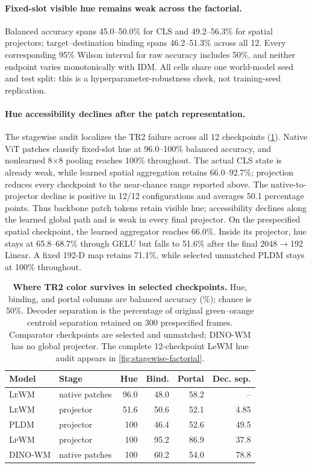 \documentclass{article}
\newcommand{\lewm}{\textsc{LeWM}}
\newcommand{\pldm}{\textsc{PLDM}}
\newcommand{\lpwm}{\textsc{LpWM}}
\newcommand{\dinowm}{\textsc{DINO-WM}}
\begin{document}
\paragraph{Fixed-slot visible hue remains weak across the factorial.}
Balanced accuracy spans 45.0--50.0\% for CLS and 49.2--56.3\% for spatial
projectors; target--destination binding spans 46.2--51.3\% across all 12.
Every corresponding 95\% Wilson interval for raw accuracy includes 50\%, and
neither endpoint varies monotonically with IDM.  All cells share one
world-model seed and test split: this is a hyperparameter-robustness check, not
training-seed replication.

\paragraph{Hue accessibility declines after the patch representation.}
The stagewise audit localizes the TR2 failure across all 12 checkpoints
(\cref{tab:tr2-stagewise}).  Native ViT patches classify fixed-slot hue at
96.0--100\% balanced accuracy, and nonlearned 8$\times$8 pooling reaches 100\%
throughout.  The actual CLS state is already weak, while learned spatial
aggregation retains 66.0--92.7\%; projection reduces every checkpoint to the
near-chance range reported above.  The native-to-projector decline is positive
in 12/12 configurations and averages 50.1 percentage points.  Thus backbone patch tokens
retain visible hue; accessibility declines along the learned global path and
is weak in every final projector.  On the prespecified spatial checkpoint, the
learned aggregator reaches 66.0\%.  Inside its projector, hue stays at
65.8--68.7\% through GELU but falls to 51.6\% after the final
2048$\rightarrow$192 Linear.  A fixed 192-D map retains 71.1\%, while selected
unmatched PLDM stays at 100\% throughout.

\begin{table}[h]
\centering
\footnotesize
\setlength{\tabcolsep}{2.0pt}
\begin{tabular}{@{}llrrrr@{}}
\toprule
Model & Stage & Hue & Bind. & Portal & Dec. sep. \\
\midrule
\lewm{} & native patches & 96.0 & 48.0 & 58.2 & -- \\
\lewm{} & projector & 51.6 & 50.6 & 52.1 & 4.85 \\
\pldm{} & projector & 100 & 46.4 & 52.6 & 49.5 \\
\lpwm{} & projector & 100 & 95.2 & 86.9 & 37.8 \\
\dinowm{} & native patches & 100 & 60.2 & 54.0 & 78.8 \\
\bottomrule
\end{tabular}
\caption{\textbf{Where TR2 color survives in selected checkpoints.}
Hue, binding, and portal columns are balanced accuracy (\%); chance is 50\%.
Decoder separation is the percentage of original green--orange centroid
separation retained on 300 prespecified frames.  Comparator checkpoints are
selected and unmatched; DINO-WM has no global projector.  The complete
12-checkpoint LeWM hue audit appears in \cref{fig:stagewise-factorial}.}
\label{tab:tr2-stagewise}
\end{table}
\end{document}
